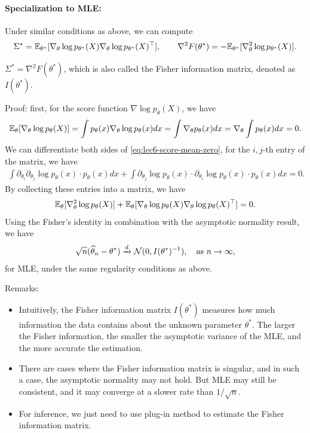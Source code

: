 \documentclass[11pt,letterpaper]{article}
\numberwithin{assumption}{lecture}
\numberwithin{theorem}{lecture}
\numberwithin{proposition}{lecture}
\numberwithin{lemma}{lecture}
\numberwithin{claim}{lecture}
\numberwithin{corollary}{lecture}
\numberwithin{definition}{lecture}
\numberwithin{conjecture}{lecture}
\numberwithin{remark}{lecture}
\numberwithin{example}{lecture}
\numberwithin{equation}{lecture}
\begin{document}
\paragraph{Specialization to MLE:} Under similar conditions as above, we can compute
\begin{align*}
  \Sigma^* = {\mathbb{E}}_{\theta^*} [\nabla_\theta \log p_{\theta^*} (X) \nabla_\theta \log p_{\theta^*} (X)^\top], \qquad \nabla^2 F(\theta^*) = - {\mathbb{E}}_{\theta^*} [\nabla_\theta^2 \log p_{\theta^*} (X)].
\end{align*}
\begin{theorem}
  $\Sigma^* = \nabla^2 F(\theta^*)$, which is also called the Fisher information matrix, denoted as $I(\theta^*)$.
\end{theorem}
Proof: first, for the score function $\nabla \log p_{\theta} (X)$, we have
\begin{align}
  {\mathbb{E}}_{\theta} [\nabla_\theta \log p_{\theta} (X)]  = \int p_\theta (x) \nabla_\theta \log p_\theta (x) dx = \int \nabla_\theta p_{\theta} (x) dx = \nabla_\theta \int p_{\theta} (x) dx = 0.\label{eq:lec6-score-mean-zero}
\end{align}
We can differentiate both sides of \eqref{eq:lec6-score-mean-zero}, for the $i, j$-th entry of the matrix, we have
\begin{align*}
  \int \partial_{\theta_i} \partial_{\theta_j} \log p_\theta (x) \cdot  p_\theta (x) dx + \int \partial_{\theta_j} \log p_\theta (x) \cdot \partial_{\theta_i} \log p_\theta (x) \cdot p_\theta (x) dx = 0.
\end{align*}
By collecting these entries into a matrix, we have
\begin{align*}
  {\mathbb{E}}_{\theta} [\nabla_\theta^2 \log p_\theta (X)] + {\mathbb{E}}_{\theta} [\nabla_\theta \log p_\theta (X) \nabla_\theta \log p_\theta (X)^\top] = 0.
\end{align*}
Using the Fisher's identity in combination with the asymptotic normality result, we have
\begin{align*}
  \sqrt{n} (\widehat{\theta}_n - \theta^*) \xrightarrow{d} \mathcal{N} (0, I(\theta^*)^{-1}), \quad \text{as } n \to \infty,
\end{align*}
for MLE, under the same regularity conditions as above.

\bigskip

Remarks:
\begin{itemize}
  \item Intuitively, the Fisher information matrix $I(\theta^*)$ measures how much information the data contains about the unknown parameter $\theta^*$. The larger the Fisher information, the smaller the asymptotic variance of the MLE, and the more accurate the estimation.
  \item There are cases where the Fisher information matrix is singular, and in such a case, the asymptotic normality may not hold. But MLE may still be consistent, and it may converge at a slower rate than $1/\sqrt{n}$.
  \item For inference, we just need to use plug-in method to estimate the Fisher information matrix.
\end{itemize}
\end{document}
